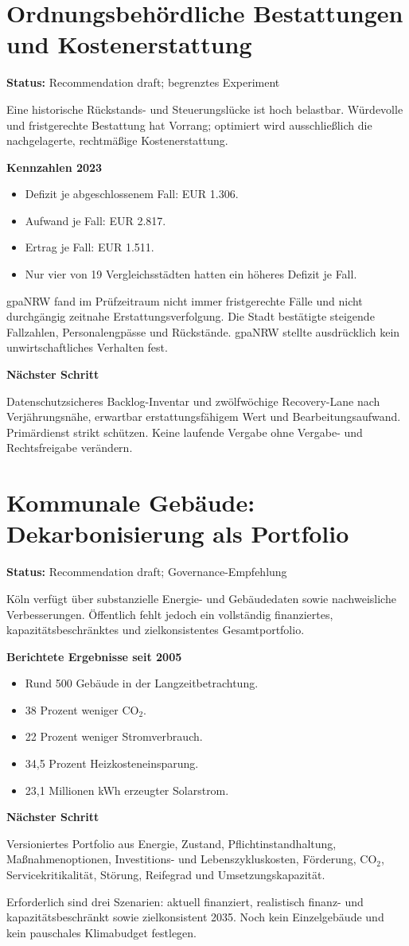 \documentclass[11pt,a4paper]{article}
\newcommand{\fall}[3]{%
  \clearpage
  \section{#1}
  \textbf{Status:} #2

  #3
}
\begin{document}
\fall{Ordnungsbehördliche Bestattungen und Kostenerstattung}{Recommendation draft; begrenztes Experiment}{
Eine historische Rückstands- und Steuerungslücke ist hoch belastbar. Würdevolle und fristgerechte Bestattung hat Vorrang; optimiert wird ausschließlich die nachgelagerte, rechtmäßige Kostenerstattung.

\textbf{Kennzahlen 2023}
\begin{itemize}
  \item Defizit je abgeschlossenem Fall: EUR 1.306.
  \item Aufwand je Fall: EUR 2.817.
  \item Ertrag je Fall: EUR 1.511.
  \item Nur vier von 19 Vergleichsstädten hatten ein höheres Defizit je Fall.
\end{itemize}

gpaNRW fand im Prüfzeitraum nicht immer fristgerechte Fälle und nicht durchgängig zeitnahe Erstattungsverfolgung. Die Stadt bestätigte steigende Fallzahlen, Personalengpässe und Rückstände. gpaNRW stellte ausdrücklich kein unwirtschaftliches Verhalten fest.

\textbf{Nächster Schritt}

Datenschutzsicheres Backlog-Inventar und zwölfwöchige Recovery-Lane nach Verjährungsnähe, erwartbar erstattungsfähigem Wert und Bearbeitungsaufwand. Primärdienst strikt schützen. Keine laufende Vergabe ohne Vergabe- und Rechtsfreigabe verändern.
}

\fall{Kommunale Gebäude: Dekarbonisierung als Portfolio}{Recommendation draft; Governance-Empfehlung}{
Köln verfügt über substanzielle Energie- und Gebäudedaten sowie nachweisliche Verbesserungen. Öffentlich fehlt jedoch ein vollständig finanziertes, kapazitätsbeschränktes und zielkonsistentes Gesamtportfolio.

\textbf{Berichtete Ergebnisse seit 2005}
\begin{itemize}
  \item Rund 500 Gebäude in der Langzeitbetrachtung.
  \item 38 Prozent weniger CO$_2$.
  \item 22 Prozent weniger Stromverbrauch.
  \item 34,5 Prozent Heizkosteneinsparung.
  \item 23,1 Millionen kWh erzeugter Solarstrom.
\end{itemize}

\textbf{Nächster Schritt}

Versioniertes Portfolio aus Energie, Zustand, Pflichtinstandhaltung, Maßnahmenoptionen, Investitions- und Lebenszykluskosten, Förderung, CO$_2$, Servicekritikalität, Störung, Reifegrad und Umsetzungskapazität.

Erforderlich sind drei Szenarien: aktuell finanziert, realistisch finanz- und kapazitätsbeschränkt sowie zielkonsistent 2035. Noch kein Einzelgebäude und kein pauschales Klimabudget festlegen.
}
\end{document}
